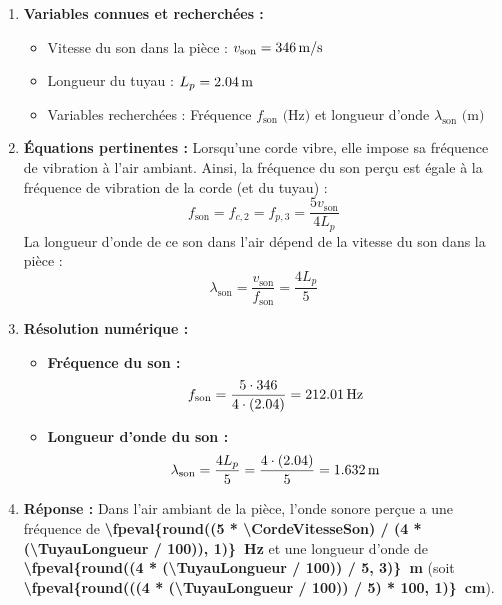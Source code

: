 \begin{enumerate}[label=\arabic*)]
    \item \textbf{Variables connues et recherchées :}
    \begin{itemize}[label= -]
        \item Vitesse du son dans la pièce : $v_{\text{son}} = \qty{346}{m/s}$
        \item Longueur du tuyau : $L_p = \qty{\fpeval{\TuyauLongueur/100}}{m}$
        \item Variables recherchées : Fréquence $f_{\text{son}} \text{ (Hz)}$ et longueur d'onde $\lambda_{\text{son}} \text{ (m)}$
    \end{itemize}

    \item \textbf{Équations pertinentes :}
    Lorsqu'une corde vibre, elle impose sa fréquence de vibration à l'air ambiant. Ainsi, la fréquence du son perçu est égale à la fréquence de vibration de la corde (et du tuyau) :
    \[
    f_{\text{son}} = f_{c, 2} = f_{p, 3} = \frac{5 v_{\text{son}}}{4 L_p}
    \]
    La longueur d'onde de ce son dans l'air dépend de la vitesse du son dans la pièce :
    \[
    \lambda_{\text{son}} = \frac{v_{\text{son}}}{f_{\text{son}}} = \frac{4 L_p}{5}
    \]

    \item \textbf{Résolution numérique :}
    \begin{itemize}[label= -]
        \item \textbf{Fréquence du son :}
        \[
        f_{\text{son}} = \frac{5 \cdot \CordeVitesseSon}{4 \cdot (\fpeval{\TuyauLongueur/100})} = \qty{\fpeval{round((5 * \CordeVitesseSon) / (4 * (\TuyauLongueur / 100)), 2)}}{Hz}
        \]
        \item \textbf{Longueur d'onde du son :}
        \[
        \lambda_{\text{son}} = \frac{4 L_p}{5} = \frac{4 \cdot (\fpeval{\TuyauLongueur/100})}{5} = \qty{\fpeval{round((4 * (\TuyauLongueur / 100)) / 5, 4)}}{m}
        \]
    \end{itemize}

    \item \textbf{Réponse :}
    Dans l'air ambiant de la pièce, l'onde sonore perçue a une fréquence de \textbf{\qty{\fpeval{round((5 * \CordeVitesseSon) / (4 * (\TuyauLongueur / 100)), 1)}}{Hz}} et une longueur d'onde de \textbf{\qty{\fpeval{round((4 * (\TuyauLongueur / 100)) / 5, 3)}}{m}} (soit \textbf{\qty{\fpeval{round(((4 * (\TuyauLongueur / 100)) / 5) * 100, 1)}}{cm}}).
\end{enumerate}